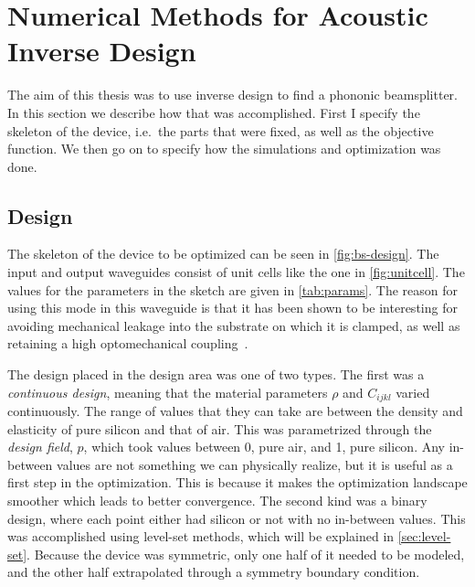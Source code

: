 \chapter{Numerical Methods for Acoustic Inverse Design}\label{sec:methods}

The aim of this thesis was to use inverse design to find a phononic
beamsplitter. In this section we describe how that was accomplished. First I
specify the skeleton of the device, i.e.\ the parts that were fixed, as well as
the objective function. We then go on to specify how the simulations and
optimization was done.

\section{Design}

The skeleton of the device to be optimized can be seen in \cref{fig:bs-design}.
The input and output waveguides consist of unit cells like the one in
\cref{fig:unitcell}.
The values for the parameters in the sketch are given in \cref{tab:params}.
The reason for using this mode in this waveguide is that it has been shown to be
interesting for avoiding mechanical leakage into the substrate on which it is
clamped, as well as retaining a high optomechanical
coupling~\cite{kolvik_clamped_2023}.

The design placed in the design area was one of two types.
The first was a \emph{continuous design}, meaning that the material parameters
$\rho$ and $C_{ijkl}$ varied continuously. The range of values that they
can take are between the density and elasticity of pure silicon and that of air.
This was parametrized through the \emph{design field}, $p$, which took values
between 0, pure air, and 1, pure silicon.
Any in-between values are not something we can physically realize, but it is
useful as a first step in the optimization. This is because it makes the
optimization landscape smoother which leads to better convergence.
The second kind was a binary design, where each point either had silicon or not
with no in-between values.
This was accomplished using level-set methods, which will be explained in
\cref{sec:level-set}.
Because the device was symmetric, only one half of it needed to be
modeled, and the other half extrapolated through a symmetry boundary condition.

